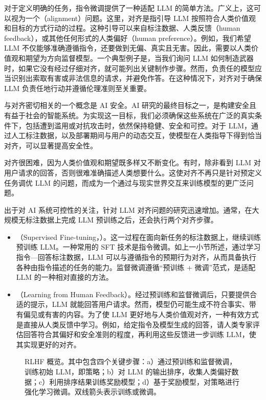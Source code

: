 \noindent 对于定义明确的任务，指令微调提供了一种适配 LLM 的简单方法。广义上，这可以视为一个（alignment）问题。这里，对齐是指引导 LLM 按照符合人类价值观和目标的方式行动的过程。这种引导可以来自标注数据、人类反馈（human feedback），或其他任何形式的人类偏好（human preference）。例如，我们希望 LLM 不仅能够准确遵循指令，还要做到无偏、真实且无害。因此，需要以人类价值观和期望为方向监督模型。一个典型例子是，当我们询问 LLM 如何制造武器时，如果它没有经过仔细对齐，就可能列出关键制作步骤。然而，负责任的模型应当识别出索取有害或非法信息的请求，并避免作答。在这种情况下，对齐对于确保 LLM 负责任地行动并遵循伦理准则至关重要。

与对齐密切相关的一个概念是 AI 安全。AI 研究的最终目标之一，是构建安全且有益于社会的智能系统。为实现这一目标，我们必须确保这些系统在广泛的真实条件下，包括遭到滥用或对抗攻击时，依然保持稳健、安全和可控。对于 LLM，通过人工标注数据，以及部署期间与用户的动态交互，使模型在人类指导下得到恰当对齐，可以显著提高安全性。

对齐很困难，因为人类价值观和期望既多样又不断变化。有时，除非看到 LLM 对用户请求的回答，否则很难准确描述人类想要什么。这使对齐不再只是针对预定义任务调优 LLM 的问题，而成为一个通过与现实世界交互来训练模型的更广泛问题。

出于对 AI 系统可控性的关注，针对 LLM 对齐问题的研究迅速增加。通常，在大规模无标注数据上完成 LLM 预训练之后，还会执行两个对齐步骤。

\begin{itemize}
\item \vspace{0.5em} （Supervised Fine-tuning，）。这一过程在面向新任务的标注数据上，继续训练预训练 LLM。一种常用的 SFT 技术是指令微调。如上一小节所述，通过学习指令—回答标注数据，LLM 可以与遵循指令的预期行为对齐，从而具备执行各种由指令描述的任务的能力。监督微调遵循“预训练 + 微调”范式，是适配 LLM 的一种相对直接的方法。
\item \vspace{0.3em} （Learning from Human Feedback）。经过预训练和监督微调后，只要提供合适的提示，LLM 就能回答用户请求。然而，模型仍可能生成不符合事实、带有偏见或有害的内容。为了使 LLM 更好地与人类价值观对齐，一种有效方式是直接从人类反馈中学习。例如，给定指令及模型生成的回答，请人类专家评估回答符合其偏好和安全准则的程度，再利用这些反馈进一步训练 LLM，使其实现更好的对齐。
\end{itemize}
\vspace{0.5em}

\begin{figure}[!t]
\centering

\caption{RLHF 概览。其中包含四个关键步骤：a）通过预训练和监督微调，训练初始 LLM，即策略；b）对 LLM 的输出排序，收集人类偏好数据；c）利用排序结果训练奖励模型；d）基于奖励模型，对策略进行强化学习微调。双线箭头表示训练或微调。}
\label{fig:llm-rlhf-overview}
\end{figure}


